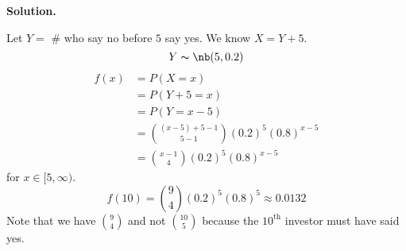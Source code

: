 \textbf{Solution.}

Let $ Y= $ \# who say no before $ 5 $ say yes. We know $ X=Y+5 $.
\[ Y\thicksim\nb(5,0.2) \]
\begin{align*}
    f(x)&=P(X=x)\\
    &=P(Y+5=x)\\
    &=P(Y=x-5)\\
    &=\binom{(x-5)+5-1}{5-1}(0.2)^5(0.8)^{x-5}\\
    &=\binom{x-1}{4}(0.2)^5(0.8)^{x-5}
\end{align*}
for $ x\in[5,\infty) $.
\[ f(10)=\binom{9}{4}(0.2)^5(0.8)^5\approx 0.0132\]
Note that we have $ \binom{9}{4} $ and not $ \binom{10}{5} $ because
the $10^{\text{th}}$ investor must have said yes.
